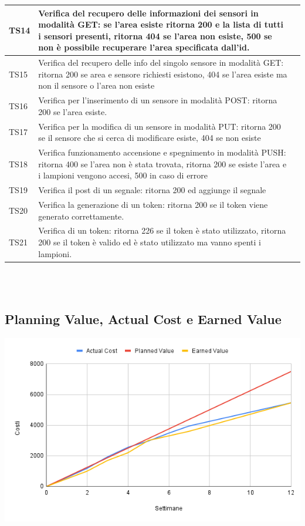 \documentclass[a4paper, 12pt]{article}
\begin{document}
\begin{center}
	\begin{tabularx}{\textwidth}{|X|X|X|}
		\hline
		TS14 & Verifica del recupero delle informazioni dei sensori in modalità GET: se l'area esiste ritorna 200 e la lista di tutti i sensori presenti, ritorna 404 se l'area non esiste, 500 se non è possibile recuperare l'area specificata dall'id. & \\
		\hline
		TS15 & Verifica del recupero delle info del singolo sensore in modalità GET: ritorna 200 se area e sensore richiesti esistono, 404 se l'area esiste ma non il sensore o l'area non esiste & \\
		\hline
		TS16 & Verifica per l'inserimento di un sensore in modalità POST: ritorna 200 se l'area esiste.  & \\
		\hline
		TS17 & Verifica per la modifica di un sensore in modalità PUT: ritorna 200 se il sensore che si cerca di modificare esiste, 404 se non esiste & \\
		\hline
		TS18 & Verifica funzionamento accensione e spegnimento in modalità PUSH: ritorna 400 se l'area non è stata trovata, ritorna 200 se esiste l'area e i lampioni vengono accesi, 500 in caso di errore & \\
		\hline
		TS19 & Verifica il post di un segnale: ritorna 200 ed aggiunge il segnale & \\
		\hline
		TS20 & Verifica la generazione di un token: ritorna 200 se il token viene generato correttamente. & \\
		\hline
		TS21 & Verifica di un token: ritorna 226 se il token è stato utilizzato, ritorna 200 se il token è valido ed è stato utilizzato ma vanno spenti i lampioni. & \\
		\hline
	\end{tabularx}\\[8pt]
	\mbox{}\\
\end{center}


\subsection{Planning Value, Actual Cost e Earned Value}
\begin{center}
	\includegraphics[scale=0.5]{AC_PV_EV.png}
\end{center}
\end{document}

